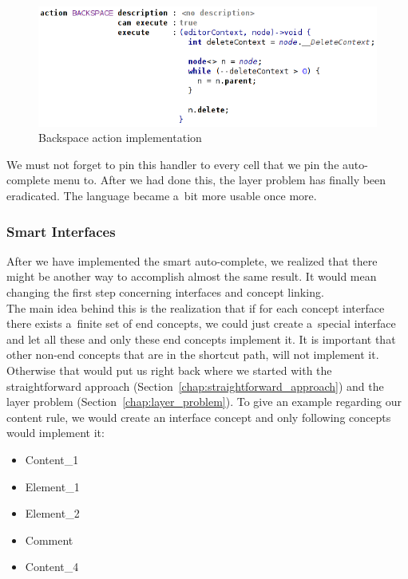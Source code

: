 \begin{figure}[h]
	\centering
	\includegraphics[width=\textwidth]{./img/backspace_action.png}
	\caption{Backspace action implementation}
	\label{fig:backspace_action}
\end{figure}

We must not forget to pin this handler to every cell that we pin the auto-complete menu to.
After we had done this, the layer problem has finally been eradicated.
The language became a~bit more usable once more.

\subsubsection{Smart Interfaces}

After we have implemented the smart auto-complete, we realized that there might be another way to accomplish almost the same result.
It would mean changing the first step concerning interfaces and concept linking.
\\

The main idea behind this is the realization that if for each concept interface there exists a~finite set of end concepts, we could just create a~special interface and let all these and only these end concepts implement it.
It is important that other non-end concepts that are in the shortcut path, will not implement it.
Otherwise that would put us right back where we started with the straightforward approach (Section~\ref{chap:straightforward_approach}) and the layer problem (Section~\ref{chap:layer_problem}).
To give an example regarding our content rule, we would create an  interface concept and only following concepts would implement it:

\begin{itemize}
	\itemsep0em
	\item Content{\_}1
	\item Element{\_}1
	\item Element{\_}2
	\item Comment
	\item Content{\_}4
\end{itemize}

